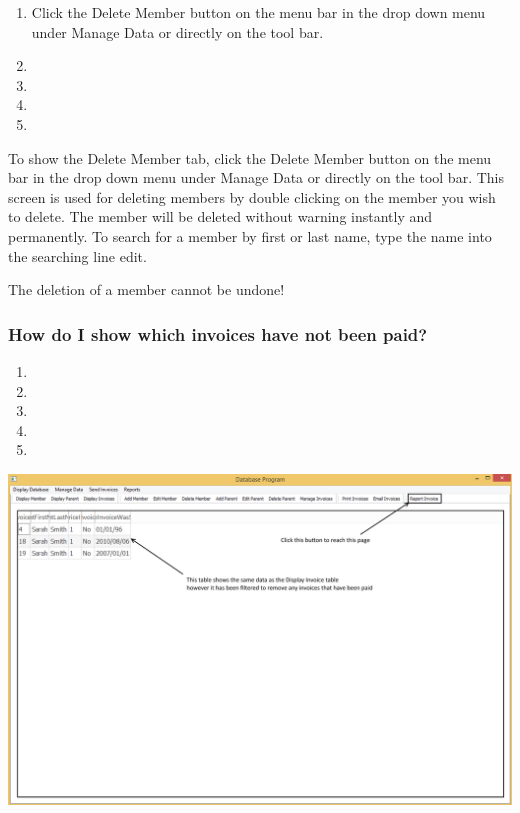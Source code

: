 \begin{enumerate}
	\item Click the Delete Member button on the menu bar in the drop down menu under Manage Data or directly on the tool bar.
	\item 
	\item 
	\item 
	\item 
\end{enumerate}

To show the Delete Member tab, click the Delete Member button on the menu bar in the drop down menu under Manage Data or directly on the tool bar. This screen is used for deleting members by double clicking on the member you wish to delete. The member will be deleted without warning instantly and permanently. To search for a member by first or last name, type the name into the searching line edit.

The deletion of a member cannot be undone!

\subsubsection{How do I show which invoices have not been paid?}
\label{report_invoice}

\begin{enumerate}
	\item 
	\item 
	\item 
	\item 
	\item 
\end{enumerate}

\includegraphics[width=\textwidth]{./Manual/Images/ReportInvoice.png}

